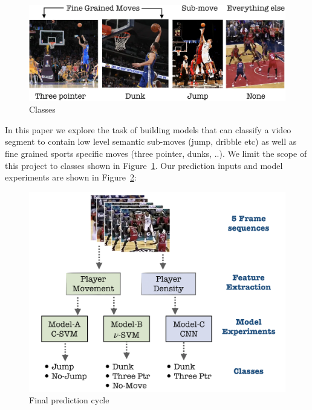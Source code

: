 \documentclass{article}
\begin{document}
\begin{figure}[ht]
\vskip 0.15in
\begin{center}
\centerline{\includegraphics[width=\columnwidth]{Classes.png}}
\caption{Classes}
\label{fig:classes}
\end{center}
\vskip -0.2in
\end{figure}

In this paper we explore the task of building models that can classify a video segment to contain low level semantic sub-moves (jump, dribble etc) as well as fine grained sports specific moves (three pointer, dunks, ..). We limit the scope of this project to classes shown in Figure~\ref{fig:classes}. Our prediction inputs and model experiments are shown in Figure~\ref{fig:e2e}:

\begin{figure}[ht]
\vskip 0.15in
\begin{center}
\centerline{\includegraphics[width=\columnwidth]{IO.png}}
\caption{Final prediction cycle}
\label{fig:e2e}
\end{center}
\vskip -0.2in
\end{figure}
\end{document}
